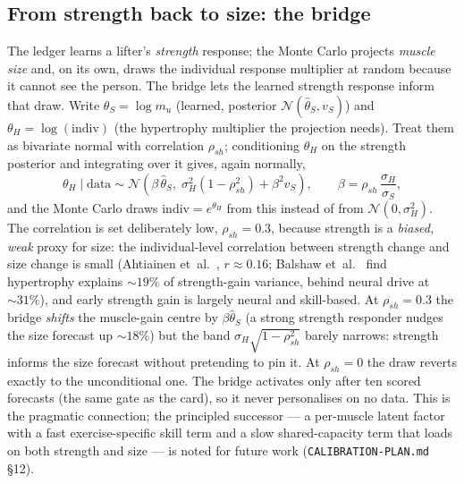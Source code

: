 \documentclass[11pt,a4paper]{article}
\begin{document}
\subsection{From strength back to size: the bridge}\label{sec:bridge}
The ledger learns a lifter's \emph{strength} response; the Monte Carlo projects \emph{muscle size} and, on its own, draws the individual response multiplier at random because it cannot see the person. The bridge lets the learned strength response inform that draw. Write $\theta_S=\log m_u$ (learned, posterior $\mathcal N(\hat\theta_S, v_S)$) and $\theta_H=\log(\text{indiv})$ (the hypertrophy multiplier the projection needs). Treat them as bivariate normal with correlation $\rho_{sh}$; conditioning $\theta_H$ on the strength posterior and integrating over it gives, again normally,
\begin{equation}\label{eq:bridge}
\theta_H \mid \text{data} \sim \mathcal N\!\left(\beta\,\hat\theta_S,\; \sigma_H^2(1-\rho_{sh}^2)+\beta^2 v_S\right),\qquad \beta=\rho_{sh}\,\frac{\sigma_H}{\sigma_S},
\end{equation}
and the Monte Carlo draws $\text{indiv}=e^{\theta_H}$ from this instead of from $\mathcal N(0,\sigma_H^2)$. The correlation is set deliberately low, $\rho_{sh}=0.3$, because strength is a \emph{biased, weak} proxy for size: the individual-level correlation between strength change and size change is small (Ahtiainen et~al.~\cite{ahtiainen}, $r\approx0.16$; Balshaw et~al.~\cite{balshaw} find hypertrophy explains ${\sim}19\%$ of strength-gain variance, behind neural drive at ${\sim}31\%$), and early strength gain is largely neural and skill-based. At $\rho_{sh}=0.3$ the bridge \emph{shifts} the muscle-gain centre by $\beta\hat\theta_S$ (a strong strength responder nudges the size forecast up ${\sim}18\%$) but the band $\sigma_H\sqrt{1-\rho_{sh}^2}$ barely narrows: strength informs the size forecast without pretending to pin it. At $\rho_{sh}=0$ the draw reverts exactly to the unconditional one. The bridge activates only after ten scored forecasts (the same gate as the card), so it never personalises on no data. This is the pragmatic connection; the principled successor --- a per-muscle latent factor with a fast exercise-specific skill term and a slow shared-capacity term that loads on both strength and size --- is noted for future work (\texttt{CALIBRATION-PLAN.md} §12).
\end{document}
